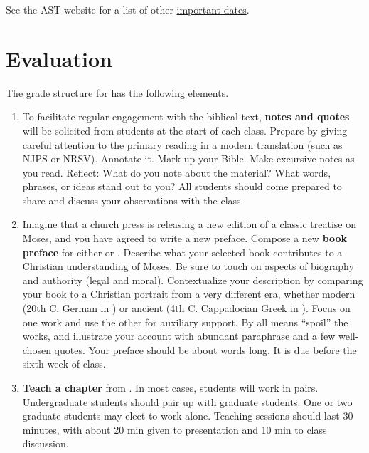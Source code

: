 \documentclass[titlepage]{article}
\begin{document}
See the AST website for a list of other \href{https://www.astheology.ns.ca/students/index.html}{important dates}.

\section{Evaluation}
\label{evaluation}

The grade structure for \ccode has the following elements.

\begin{enumerate}

	\item To facilitate regular engagement with the biblical text,
	\textbf{notes and quotes} will be solicited from students at the
	start of each class. Prepare by giving careful attention to the
	primary reading in a modern translation (such as NJPS or NRSV).
	Annotate it. Mark up your Bible. Make excursive notes as you read.
	Reflect: What do you note about the material? What words, phrases,
	or ideas stand out to you?  All students should come prepared to share and
	discuss your observations with the class.

	\item Imagine that a church press is releasing a new edition of a
	classic treatise on Moses, and you have agreed to write a new
	preface. Compose a new \textbf{book preface} for either \cite{nyssa}
	or \cite{vonrad}. Describe what your selected book contributes to a
	Christian understanding of Moses. Be sure to touch on aspects of
	biography and authority (legal and moral). Contextualize your
	description by comparing your book to a Christian portrait from a
	very different era, whether modern (20th C. German in \cite{vonrad})
	or ancient (4th C. Cappadocian Greek in \cite{nyssa}). Focus on one
	work and use the other for auxiliary support. By all means “spoil”
	the works, and illustrate your account with abundant paraphrase and
	a few well-chosen quotes. Your preface should be about
	 words long. It is due before the sixth week of
	class.

	\item \textbf{Teach a chapter} from \cite{sommer}. In most cases,
	students will work in pairs. Undergraduate students should pair up
	with graduate students. One or two graduate students may elect to
	work alone. Teaching sessions should last 30 minutes, with about 20
	min given to presentation and 10 min to class discussion.


\end{enumerate}
\end{document}

